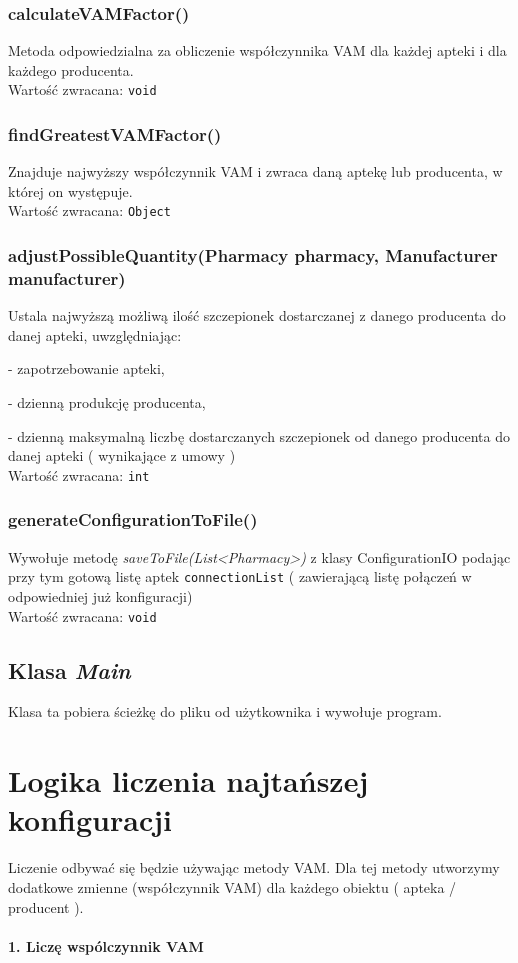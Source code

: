 \documentclass[]{article}
\begin{document}
    \subsubsection{calculateVAMFactor()}
    Metoda odpowiedzialna za obliczenie współczynnika VAM dla każdej apteki i dla każdego producenta. \\
    Wartość zwracana: \verb|void|

    \subsubsection{findGreatestVAMFactor()}
    Znajduje najwyższy współczynnik VAM i zwraca daną aptekę lub producenta, w której on występuje.\\
    Wartość zwracana: \verb|Object|

    \subsubsection{adjustPossibleQuantity(Pharmacy pharmacy, Manufacturer manufacturer)}
    Ustala najwyższą możliwą ilość szczepionek dostarczanej z danego producenta do danej apteki, uwzględniając:

    - zapotrzebowanie apteki,

    - dzienną produkcję producenta,

    - dzienną maksymalną liczbę dostarczanych szczepionek od danego producenta do danej apteki ( wynikające z umowy )\\
    Wartość zwracana: \verb|int|

    \subsubsection{generateConfigurationToFile()}
    Wywołuje metodę \textit{saveToFile(List<Pharmacy>)} z klasy ConfigurationIO podając przy tym gotową listę aptek \verb|connectionList| ( zawierającą listę połączeń w odpowiedniej już konfiguracji)\\
    Wartość zwracana: \verb|void|

    \subsection{Klasa \textit{Main}}
    Klasa ta pobiera ścieżkę do pliku od użytkownika i wywołuje program.


    \section{Logika liczenia najtańszej konfiguracji}
    \newcommand\tab[1][1cm]{\hspace*{#1}}
    Liczenie odbywać się będzie używając metody VAM. Dla tej metody utworzymy dodatkowe zmienne (współczynnik VAM) dla każdego obiektu ( apteka / producent ).\\\\
    \textbf{1. Liczę wspólczynnik VAM}
\end{document}
